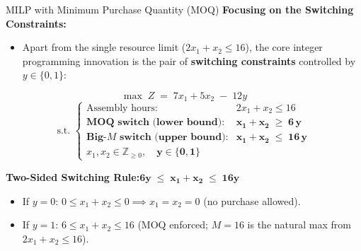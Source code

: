 \documentclass[aspectratio=169]{beamer}
\begin{document}
\begin{frame}{MILP with Minimum Purchase Quantity (MOQ)}
\textbf{Focusing on the Switching Constraints:}
\begin{itemize}
  \item Apart from the single resource limit ($2x_1 + x_2 \le 16$), the core integer programming innovation is the pair of \textbf{switching constraints} controlled by $y \in \{0,1\}$:
\end{itemize}

\[
\max \; Z \;=\; 7x_1 + 5x_2 \;-\; 12y
\]
\[
\text{s.t. }\begin{cases}
\text{Assembly hours:} & 2x_1 + x_2 \le 16 \\[4pt]
\textbf{MOQ switch (lower bound):} & \mathbf{x_1 + x_2 \;\ge\; 6\,y} \\[2pt]
\textbf{Big-$M$ switch (upper bound):} & \mathbf{x_1 + x_2 \;\le\; 16\,y} \\[4pt]
x_1, x_2 \in \mathbb{Z}_{\ge 0},\quad \mathbf{y \in \{0,1\}}
\end{cases}
\]

\centering
\alert{\textbf{Two-Sided Switching Rule:}\quad $\mathbf{6y \;\le\; x_1 + x_2 \;\le\; 16y}$}
\begin{itemize}
  \footnotesize
  \item If $y=0$: $0 \le x_1 + x_2 \le 0 \implies x_1 = x_2 = 0$ (no purchase allowed).
  \item If $y=1$: $6 \le x_1 + x_2 \le 16$ (MOQ enforced; $M=16$ is the natural max from $2x_1 + x_2 \le 16$).
\end{itemize}
\end{frame}
\end{document}
